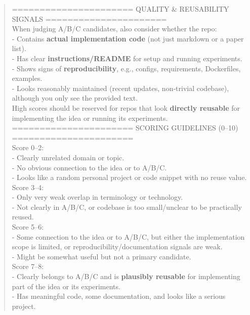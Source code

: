 \begin{quote}
\begin{tcolorbox}[breakable,colback=search!20!white, colframe=search!60!black, title=\textbf{Prompt for Search Agent (Search Results Scoring - Code)}]
        ====================== QUALITY \& REUSABILITY SIGNALS ======================\\
        When judging A/B/C candidates, also consider whether the repo:\\
        - Contains \textbf{actual implementation code} (not just markdown or a paper list).\\
        - Has clear \textbf{instructions/README} for setup and running experiments.\\
        - Shows signs of \textbf{reproducibility}, e.g., configs, requirements, Dockerfiles, examples.\\
        - Looks reasonably maintained (recent updates, non‑trivial codebase), although you only see the provided text.\\

        High scores should be reserved for repos that look \textbf{directly reusable} for implementing the idea or running its experiments.\\

        ====================== SCORING GUIDELINES (0–10) ======================\\
        Score 0–2:\\
        - Clearly unrelated domain or topic.\\
        - No obvious connection to the idea or to A/B/C.\\
        - Looks like a random personal project or code snippet with no reuse value.\\

        Score 3–4:\\
        - Only very weak overlap in terminology or technology.\\
        - Not clearly in A/B/C, or codebase is too small/unclear to be practically reused.\\

        Score 5–6:\\
        - Some connection to the idea or to A/B/C, but either the implementation scope is limited, or reproducibility/documentation signals are weak.\\
        - Might be somewhat useful but not a primary candidate.\\

        Score 7–8:\\
        - Clearly belongs to A/B/C and is \textbf{plausibly reusable} for implementing part of the idea or its experiments.\\
        - Has meaningful code, some documentation, and looks like a serious project.\\


\end{tcolorbox}
\end{quote}
